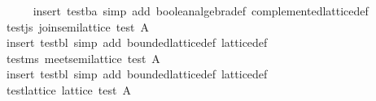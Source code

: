 \begin{isabellebody}
%
\isadelimproof
\ \ \ \ %
\endisadelimproof
%
\isatagproof
{}\isamarkupfalse%
\ {}insert\ test{}ba{}\ simp\ add{}\ boolean{}algebra{}def\ complemented{}lattice{}def{}%
\endisatagproof
{\isafoldproof}%
%
\isadelimproof
\isanewline
%
\endisadelimproof
\isanewline
\ \ \isamarkupfalse%
\ test{}js{}\ {}join{}semilattice\ {}test\ A{}{}\isanewline
%
\isadelimproof
\ \ \ \ %
\endisadelimproof
%
\isatagproof
{}\isamarkupfalse%
\ {}insert\ test{}bl{}\ simp\ add{}\ bounded{}lattice{}def\ lattice{}def{}%
\endisatagproof
{\isafoldproof}%
%
\isadelimproof
\isanewline
%
\endisadelimproof
\isanewline
\ \ \isamarkupfalse%
\ test{}ms{}\ {}meet{}semilattice\ {}test\ A{}{}\isanewline
%
\isadelimproof
\ \ \ \ %
\endisadelimproof
%
\isatagproof
{}\isamarkupfalse%
\ {}insert\ test{}bl{}\ simp\ add{}\ bounded{}lattice{}def\ lattice{}def{}%
\endisatagproof
{\isafoldproof}%
%
\isadelimproof
\isanewline
%
\endisadelimproof
\isanewline
\ \ \isamarkupfalse%
\ test{}lattice{}\ {}lattice\ {}test\ A{}{}\isanewline

\end{isabellebody}
